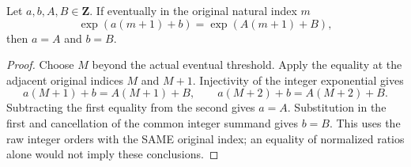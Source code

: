 \begin{lemma}
\label{lem:gauss-common-leading-affine-uniqueness}
\leanok
Let $a,b,A,B\in\mathbf Z$. If eventually in the original natural index $m$
\[
 \exp(a(m+1)+b)=\exp(A(m+1)+B),
\]
then $a=A$ and $b=B$.
\end{lemma}
\begin{proof}
Choose $M$ beyond the actual eventual threshold. Apply the equality at
the adjacent original indices $M$ and $M+1$. Injectivity of the integer
exponential gives
\[
 a(M+1)+b=A(M+1)+B,\qquad
 a(M+2)+b=A(M+2)+B.
\]
Subtracting the first equality from the second gives $a=A$. Substitution
in the first and cancellation of the common integer summand gives
$b=B$. This uses the raw integer orders with the SAME original index;
an equality of normalized ratios alone would not imply these conclusions.
\end{proof}

